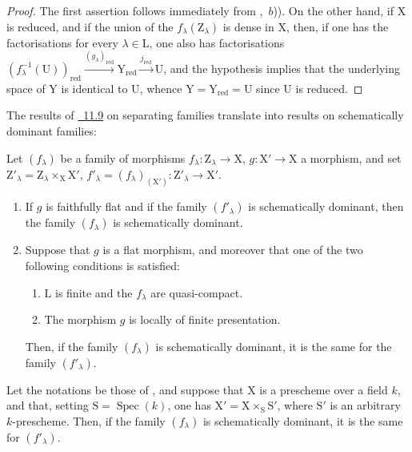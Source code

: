 \begin{proof}
The first assertion follows immediately from ,~$b$)).
On the other hand, if $\mathrm{X}$ is reduced, and if the union of the $f_\lambda(\mathrm{Z}_\lambda)$ is dense in $\mathrm{X}$, then, if one has the factorisations  for every $\lambda\in\mathrm{L}$, one also has factorisations $(f_\lambda^{-1}(\mathrm{U}))_\mathrm{red}\xrightarrow{(g_\lambda)_\mathrm{red}}\mathrm{Y}_\mathrm{red}\xrightarrow{j_\mathrm{red}}\mathrm{U}$, and the hypothesis implies that the underlying space of $\mathrm{Y}$ is identical to $\mathrm{U}$, whence $\mathrm{Y}=\mathrm{Y}_\mathrm{red}=\mathrm{U}$ since $\mathrm{U}$ is reduced.
\end{proof}

The results of {\hyperref[subsection:IV.11.9]{\textsection~11.9}} on separating families translate into results on schematically dominant families:

\begin{theorem}[11.10.5]
\label{IV.11.10.5}
Let $(f_\lambda)$ be a family of morphisms $f_\lambda:\mathrm{Z}_\lambda\to\mathrm{X}$, $g:\mathrm{X}'\to\mathrm{X}$ a morphism, and set $\mathrm{Z}'_\lambda=\mathrm{Z}_\lambda\times_\mathrm{X}\mathrm{X}'$, $f'_\lambda=(f_\lambda)_{(\mathrm{X}')}:\mathrm{Z}'_\lambda\to\mathrm{X}'$.
\begin{enumerate}[label=(\roman*)]
  \item If $g$ is faithfully flat and if the family $(f'_\lambda)$ is schematically dominant, then the family $(f_\lambda)$ is schematically dominant.
  \item Suppose that $g$ is a flat morphism, and moreover that one of the two following conditions is satisfied:
  \begin{enumerate}[label=\emph{\alph*)}]
    \item $\mathrm{L}$ is finite and the $f_\lambda$ are quasi-compact.
    \item The morphism $g$ is locally of finite presentation.
  \end{enumerate}
  Then, if the family $(f_\lambda)$ is schematically dominant, it is the same for the family $(f'_\lambda)$.
\end{enumerate}
\end{theorem}

\begin{proposition}[11.10.6]
\label{IV.11.10.6}
Let the notations be those of , and suppose that $\mathrm{X}$ is a prescheme over a field $k$, and that, setting $\mathrm{S}=\operatorname{Spec}(k)$, one has $\mathrm{X}'=\mathrm{X}\times_\mathrm{S}\mathrm{S}'$, where $\mathrm{S}'$ is an arbitrary $k$-prescheme.
Then, if the family $(f_\lambda)$ is schematically dominant, it is the same for $(f'_\lambda)$.
\end{proposition}

